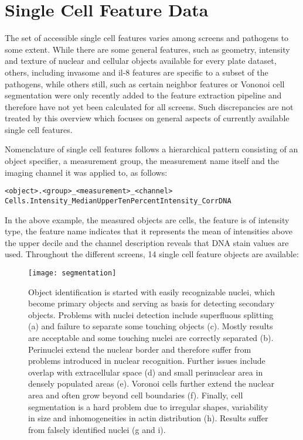 \section{Single Cell Feature Data}
\label{sec:scf-data}
The set of accessible single cell features varies among screens and pathogens to some extent. While there are some general features, such as geometry, intensity and texture of nuclear and cellular objects available for every plate dataset, others, including invasome and \gls{il-8} features are specific to a subset of the pathogens, while others still, such as certain neighbor features or Vononoi cell segmentation were only recently added to the feature extraction pipeline and therefore have not yet been calculated for all screens. Such discrepancies are not treated by this overview which focuses on general aspects of currently available single cell features.

Nomenclature of single cell features follows a hierarchical pattern consisting of an object specifier, a measurement group, the measurement name itself and the imaging channel it was applied to, as follows:
\begin{center}
\texttt{<object>.<group>\_<measurement>\_<channel>}
\texttt{Cells.Intensity\_MedianUpperTenPercentIntensity\_CorrDNA}
\end{center}
In the above example, the measured objects are cells, the feature is of intensity type, the feature name indicates that it represents the mean of intensities above the upper decile and the channel description reveals that DNA stain values are used. Throughout the different screens, 14 single cell feature objects are available:

\begin{figure}
  \centering
  \texttt{[image: segmentation]}
  \caption[Object detection of nuclei, perinuclei, voronoi cells and cell bodies along with potential pitfalls.]{Object identification is started with easily recognizable nuclei, which become primary objects and serving as basis for detecting secondary objects. Problems with nuclei detection include superfluous splitting (a) and failure to separate some touching objects (c). Mostly results are acceptable and some touching nuclei are correctly separated (b). Perinuclei extend the nuclear border and therefore suffer from problems introduced in nuclear recognition. Further issues include overlap with extracellular space (d) and small perinuclear area in densely populated areas (e). Voronoi cells further extend the nuclear area and often grow beyond cell boundaries (f). Finally, cell segmentation is a hard problem due to irregular shapes, variability in size and inhomogeneities in actin distribution (h). Results suffer from falsely identified nuclei (g and i).}
  \label{fig:segmentation}
\end{figure}

